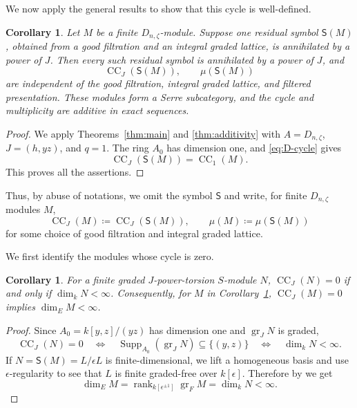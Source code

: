 \documentclass[11pt]{article}
\newtheorem{corollary}[theorem]{Corollary}
\theoremstyle{definition}
\newcommand{\gr}{\operatorname{gr}}
\newcommand{\rank}{\operatorname{rank}}
\newcommand{\CC}{\operatorname{CC}}
\newcommand{\Supp}{\operatorname{Supp}}
\begin{document}
We now apply the general results to show that this cycle is well-defined.

\begin{corollary}\label{thm:quaternionic-CC}
Let $M$ be a finite $D_{n,\zeta}$-module. Suppose one residual
symbol $\mathsf S(M)$, obtained from a good filtration and an
integral graded lattice, is annihilated by a power of $J$.
Then every such residual symbol is annihilated by a power of
$J$, and
\[
 \CC_J(\mathsf S(M)),\qquad \mu(\mathsf S(M))
\]
are independent of the good filtration, integral graded lattice,
and filtered presentation. These modules form a Serre subcategory,
and the cycle and multiplicity are additive in exact sequences.
\end{corollary}
\begin{proof}
We apply Theorems~\ref{thm:main} and \ref{thm:additivity} with
$A=D_{n,\zeta}$, $J=(h,yz)$, and $q=1$. The ring $A_0$ has
dimension one, and \eqref{eq:D-cycle} gives
\[
 \CC_J(\mathsf S(M))=\CC_1(M).
\]
This proves all the assertions.
\end{proof}

Thus, by abuse of notations, we omit the symbol $\mathsf{S}$ and write, for finite $D_{n,\zeta}$ modules $M$, 
\[\CC_J(M)\coloneqq\CC_J(\mathsf S(M)),\qquad\mu(M)\coloneqq\mu(\mathsf{S}(M))\]
for some choice of good filtration and integral graded lattice. 

We first identify the modules whose cycle is zero.

\begin{corollary}\label{cor:D-zero}
For a finite graded $J$-power-torsion $S$-module $N$,
$\CC_J(N)=0$ if and only if $\dim_kN<\infty$.
Consequently, for $M$ in Corollary~\ref{thm:quaternionic-CC},
$\CC_J(M)=0$ implies $\dim_EM<\infty$.
\end{corollary}
\begin{proof}
Since $A_0=k[y,z]/(yz)$ has dimension one and $\gr_JN$ is graded,
\[
 \CC_J(N)=0
 \quad\Longleftrightarrow\quad
 \Supp_{A_0}(\gr_JN)\subseteq\{(y,z)\}
 \quad\Longleftrightarrow\quad \dim_kN<\infty.
\]
If $N=\mathsf S(M)=L/\epsilon L$ is finite-dimensional, we lift a homogeneous
basis and use $\epsilon$-regularity to see that $L$ is finite graded-free
over $k[\epsilon]$. Therefore by \cite[Theorem~I.4.2.4.(5)]{LvO96} we get
\[
 \dim_EM=\rank_{k[\epsilon^{\pm1}]}\gr_FM=\dim_kN<\infty.
\]
\end{proof}
\end{document}
